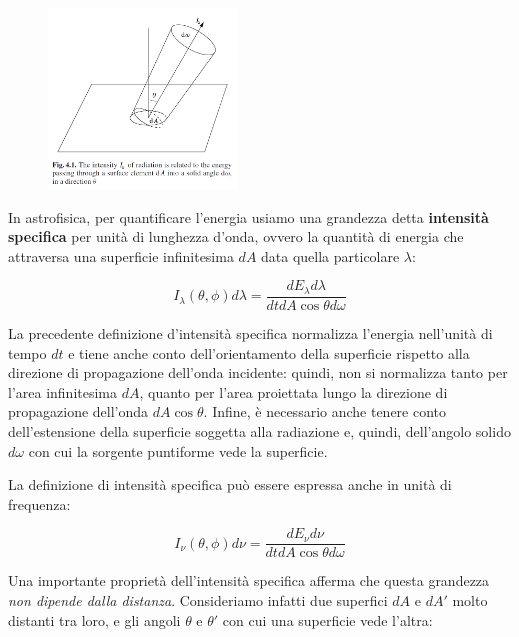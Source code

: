 \begin{minipage}{0.395\textwidth}
    \begin{figure}[H]
        \centering
        \includegraphics[width=5cm]{immagini/intensita_specifica_area.png}
    \end{figure}
\end{minipage}
\begin{minipage}{0.6\textwidth}
    In astrofisica, per quantificare l'energia usiamo una grandezza detta \textbf{intensità specifica} per unità di lunghezza d'onda, ovvero la quantità di energia che attraversa una superficie infinitesima $dA$ data quella particolare $\lambda$:

    \begin{equation}
        I_{\lambda}(\theta,\phi)d\lambda
        = \frac{dE_{\lambda}d\lambda}{dtdA\cos{\theta}d\omega}
    \end{equation}
\end{minipage}

\vspace{0.2cm}La precedente definizione d'intensità specifica normalizza l'energia nell'unità di tempo $dt$ e tiene anche conto dell'orientamento della superficie rispetto alla direzione di propagazione dell'onda incidente: quindi, non si normalizza tanto per l'area infinitesima $dA$, quanto per l'area proiettata lungo la direzione di propagazione dell'onda $dA\cos{\theta}$. Infine, è necessario anche tenere conto dell'estensione della superficie soggetta alla radiazione e, quindi, dell'angolo solido $d\omega$ con cui la sorgente puntiforme vede la superficie.

La definizione di intensità specifica può essere espressa anche in unità di frequenza:

\begin{equation}
    I_{\nu}(\theta,\phi)d\nu = \frac{dE_{\nu}d\nu}{dtdA\cos{\theta}d\omega}
\end{equation}

Una importante proprietà dell'intensità specifica afferma che questa grandezza \textit{non dipende dalla distanza}. Consideriamo infatti due superfici $dA$ e $dA'$ molto distanti tra loro, e gli angoli $\theta$ e $\theta'$ con cui una superficie vede l'altra:

